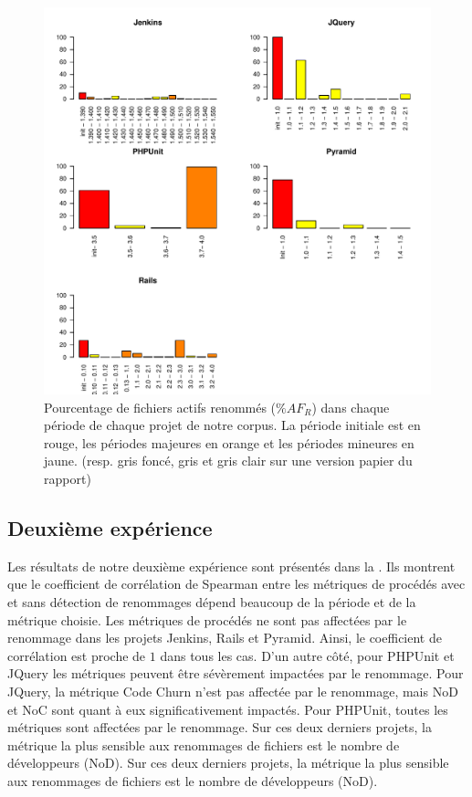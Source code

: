 \begin{figure}[h]
	\centering
	\includegraphics[width=0.85\linewidth,keepaspectratio]{data/figures/renaming2.pdf}
	\caption{Pourcentage de fichiers actifs renommés ($\%AF_R$) dans chaque période de chaque projet de notre corpus. La période initiale est en rouge, les périodes majeures en orange et les périodes mineures en jaune. (resp. gris foncé, gris et gris clair sur une version papier du rapport)}
	\label{fig:renaming2}
\end{figure}

\subsection{Deuxième expérience}
Les résultats de notre deuxième expérience sont présentés dans la . Ils montrent que le coefficient de corrélation de Spearman entre les métriques de procédés avec et sans détection de renommages dépend beaucoup de la période et de la métrique choisie. Les métriques de procédés ne sont pas affectées par le renommage dans les projets Jenkins, Rails et Pyramid. Ainsi, le coefficient de corrélation est proche de $1$ dans tous les cas. D'un autre côté, pour PHPUnit et JQuery les métriques peuvent être sévèrement impactées par le renommage. Pour JQuery, la métrique Code Churn n'est pas affectée par le renommage, mais NoD et NoC sont quant à eux significativement impactés. Pour PHPUnit, toutes les métriques sont affectées par le renommage. Sur ces deux derniers projets, la métrique la plus sensible aux renommages de fichiers est le nombre de développeurs (NoD). Sur ces deux derniers projets, la métrique la plus sensible aux renommages de fichiers est le nombre de développeurs (NoD).

